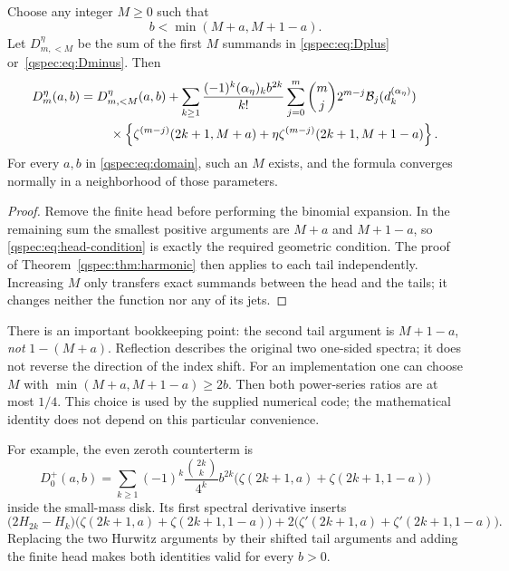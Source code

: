 \begin{theorem}
\label{qspec:thm:head}
Choose any integer $M\ge0$ such that
\begin{equation}\label{qspec:eq:head-condition}
b<\min(M+a,M+1-a).
\end{equation}
Let $D_{m,<M}^\eta$ be the sum of the first $M$ summands in
\eqref{qspec:eq:Dplus} or~\eqref{qspec:eq:Dminus}. Then
\begin{align}
D_m^\eta(a,b)={}&D_{m,<M}^\eta(a,b)
+\sum_{k\ge1}\frac{(-1)^k(\alpha_\eta)_k b^{2k}}{k!}
\sum_{j=0}^m\binom mj2^{m-j}\mathcal B_j(d_k^{(\alpha_\eta)})\notag\\
&\quad\times\left\{\zeta^{(m-j)}(2k+1,M+a)
+\eta\zeta^{(m-j)}(2k+1,M+1-a)\right\}.
\label{qspec:eq:finite-head}
\end{align}
For every $a,b$ in \eqref{qspec:eq:domain}, such an $M$ exists, and the
formula converges normally in a neighborhood of those parameters.
\end{theorem}
\begin{proof}
Remove the finite head before performing the binomial expansion. In the
remaining sum the smallest positive arguments are $M+a$ and $M+1-a$,
so \eqref{qspec:eq:head-condition} is exactly the required geometric
condition. The proof of Theorem~\ref{qspec:thm:harmonic} then applies to
each tail independently. Increasing $M$ only transfers exact summands
between the head and the tails; it changes neither the function nor any
of its jets.
\end{proof}

There is an important bookkeeping point: the second tail argument is
$M+1-a$, \emph{not} $1-(M+a)$. Reflection describes the original two
one-sided spectra; it does not reverse the direction of the index shift.
For an implementation one can choose $M$ with
$\min(M+a,M+1-a)\ge2b$. Then both power-series ratios are at most $1/4$.
This choice is used by the supplied numerical code; the mathematical
identity does not depend on this particular convenience.

For example, the even zeroth counterterm is
\[
D_0^+(a,b)=\sum_{k\ge1}(-1)^k\frac{\binom{2k}{k}}{4^k}b^{2k}
\bigl(\zeta(2k+1,a)+\zeta(2k+1,1-a)\bigr)
\]
inside the small-mass disk. Its first spectral derivative inserts
\[
\bigl(2H_{2k}-H_k\bigr)
\bigl(\zeta(2k+1,a)+\zeta(2k+1,1-a)\bigr)
+2\bigl(\zeta'(2k+1,a)+\zeta'(2k+1,1-a)\bigr).
\]
Replacing the two Hurwitz arguments by their shifted tail arguments and
adding the finite head makes both identities valid for every $b>0$.

